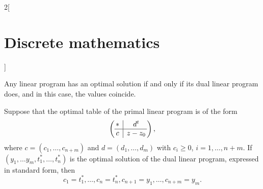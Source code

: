 \documentclass[../../../main.tex]{subfiles}
\begin{document}
\begin{multicols}{2}[\section{Discrete mathematics}]
\begin{theorem}
Any linear program has an optimal solution if and only if its dual linear program does, and in this case, the values coincide.
\end{theorem}
\begin{theorem}
Suppose that the optimal table of the primal linear program is of the form $$\left(\begin{array}{@{\,} c|c @{\,}}
    * & d^t\\
    \hline
    c & z-z_0\\
\end{array}\right),$$ where $c=(c_1,\ldots,c_{n+m})$ and $d=(d_1,\ldots,d_m)$ with $c_i\geq0$, $i=1,\ldots,n+m$. If $(y_1,\ldots y_m,t_1^*,\ldots,t_n^*)$ is the optimal solution of the dual linear program, expressed in standard form, then $$c_1=t_1^*,\ldots,c_n=t_n^*, c_{n+1}=y_1,\ldots,c_{n+m}=y_m.$$
\end{theorem}
\end{multicols}
\end{document}

